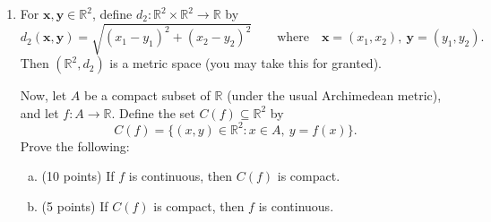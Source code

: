 \documentclass{amsart}
\newtheorem{theorem}{Theorem}
\begin{document}
\begin{enumerate}[1.]
\begin{theorem}
\begin{proof}
\begin{itemize}
                \item $0 < x < 1$. \\
                We see that 
                \begin{align*}
                    |x| &< \delta \\
                    |x| &< \frac{\epsilon}{4} \\
                    |4x| &< \epsilon \\
                    \left| \frac{4x}{3x + 2} \right| &< \epsilon \qquad \text{(since $x > 0$)} \\
                    \left| \frac{5x + 6 - 9x -6}{3x + 2} \right| &= \\
                    \left| \frac{5x + 6}{3x + 2} - \frac{9x + 6}{3x + 2} \right| &= \\
                    \left| \frac{5x + 6}{3x + 2} - \frac{3\cdot(3x + 2)}{3x + 2} \right| &= \\
                    \left| \frac{5x + 6}{3x + 2} - 3 \right| &= \\
                    \left| f(x) - 3 \right| &= \\
                \end{align*}

                \item $x \geq 1$.
                This case cannot occur, because we've already chosen $|x| < 1$.
            \end{itemize}
            Thus, for any $\epsilon > 0$, there exists a $\delta > 0$ such that 
            \[
                |x - 0| < \delta \Rightarrow |f(x) - 3| < \epsilon.    
            \]
        \end{proof}
    \end{theorem}
    
    \newpage
    \item For $\mathbf{x}, \mathbf{y} \in \mathbb{R}^2$, define $d_2 : \mathbb{R}^2 \times \mathbb{R}^2 \to \mathbb{R}$ by
    \[ d_2(\mathbf{x},\mathbf{y}) = \sqrt{(x_1 - y_1)^2 + (x_2-y_2)^2} \qquad \text{where} \quad \mathbf{x}= (x_1,x_2),\ \mathbf{y} = (y_1,y_2).\]
    Then $(\mathbb{R}^2,d_2)$ is a metric space (you may take this for granted).
    
    Now, let $A$ be a compact subset of $\mathbb{R}$ (under the usual Archimedean metric), and let $f: A \to \mathbb{R}$. Define the set $C(f) \subseteq \mathbb{R}^2$ by
        \[ C(f) = \{ (x,y) \in \mathbb{R}^2 : x \in A,\ y= f(x)\}.\]
    Prove the following:
    \begin{enumerate}[(a)]
    \item (10 points) If $f$ is continuous, then $C(f)$ is compact.
    \item (5 points) If $C(f)$ is compact, then $f$ is continuous. 
    \end{enumerate}
    

\end{enumerate}
\end{document}
